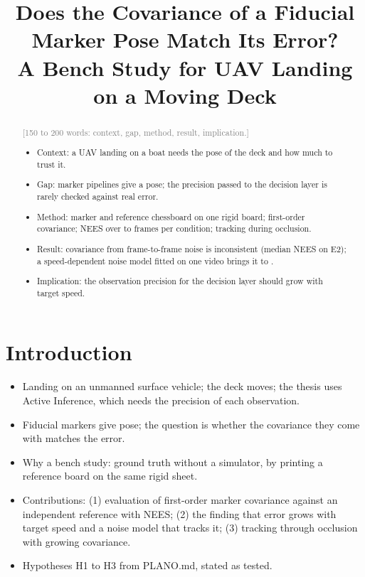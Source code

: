 \documentclass[conference]{IEEEtran}
\newcommand{\topic}[1]{\textcolor{gray}{[#1]}}
\newcommand{\topics}[1]{\begingroup\color{gray}\begin{itemize}#1\end{itemize}\endgroup}
\begin{document}
\title{Does the Covariance of a Fiducial Marker Pose Match Its Error?\\
A Bench Study for UAV Landing on a Moving Deck}

\author{
}

\maketitle

\begin{abstract}
\topic{150 to 200 words: context, gap, method, result, implication.}
\topics{
\item Context: a UAV landing on a boat needs the pose of the deck and how much to trust it.
\item Gap: marker pipelines give a pose; the precision passed to the decision layer is rarely checked against real error.
\item Method: marker and reference chessboard on one rigid board; first-order covariance; NEES over \EoneFrames{} to \EthreeFrames{} frames per condition; tracking during occlusion.
\item Result: covariance from frame-to-frame noise is inconsistent (median NEES \EtwoMedianFixed{} on E2); a speed-dependent noise model fitted on one video brings it to \EtwoMedianSpeed{}.
\item Implication: the observation precision for the decision layer should grow with target speed.
}
\end{abstract}

\section{Introduction}
\topics{
\item Landing on an unmanned surface vehicle; the deck moves; the thesis uses Active Inference, which needs the precision of each observation.
\item Fiducial markers give pose; the question is whether the covariance they come with matches the error.
\item Why a bench study: ground truth without a simulator, by printing a reference board on the same rigid sheet.
\item Contributions: (1) evaluation of first-order marker covariance against an independent reference with NEES; (2) the finding that error grows with target speed and a noise model that tracks it; (3) tracking through occlusion with growing covariance.
\item Hypotheses H1 to H3 from PLANO.md, stated as tested.
}
\end{document}

